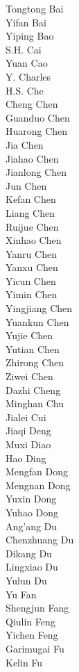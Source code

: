 Tongtong Bai\\
Yifan Bai\\
Yiping Bao\\
S.H. Cai\\
Yuan Cao\\
Y. Charles\\
H.S. Che\\
Cheng Chen\\
Guanduo Chen\\
Huarong Chen\\
Jia Chen\\
Jiahao Chen\\
Jianlong Chen\\
Jun Chen\\
Kefan Chen\\
Liang Chen\\
Ruijue Chen\\
Xinhao Chen\\
Yanru Chen\\
Yanxu Chen\\
Yicun Chen\\
Yimin Chen\\
Yingjiang Chen\\
Yuankun Chen\\
Yujie Chen\\
Yutian Chen\\
Zhirong Chen\\
Ziwei Chen\\
Dazhi Cheng\\
Minghan Chu\\
Jialei Cui\\
Jiaqi Deng\\
Muxi Diao\\
Hao Ding\\
Mengfan Dong\\
Mengnan Dong\\
Yuxin Dong\\
Yuhao Dong\\
Ang'ang Du\\
Chenzhuang Du\\
Dikang Du\\
Lingxiao Du\\
Yulun Du\\
Yu Fan\\
Shengjun Fang\\
Qiulin Feng\\
Yichen Feng\\
Garimugai Fu\\
Kelin Fu\\
